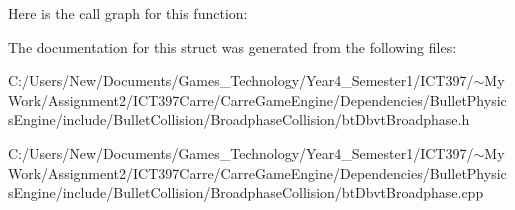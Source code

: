 Here is the call graph for this function:

The documentation for this struct was generated from the following files:\begin{CompactItemize}
\item 
C:/Users/New/Documents/Games\_\-Technology/Year4\_\-Semester1/ICT397/$\sim$My Work/Assignment2/ICT397Carre/CarreGameEngine/Dependencies/BulletPhysicsEngine/include/BulletCollision/BroadphaseCollision/btDbvtBroadphase.h\item 
C:/Users/New/Documents/Games\_\-Technology/Year4\_\-Semester1/ICT397/$\sim$My Work/Assignment2/ICT397Carre/CarreGameEngine/Dependencies/BulletPhysicsEngine/include/BulletCollision/BroadphaseCollision/btDbvtBroadphase.cpp\end{CompactItemize}
